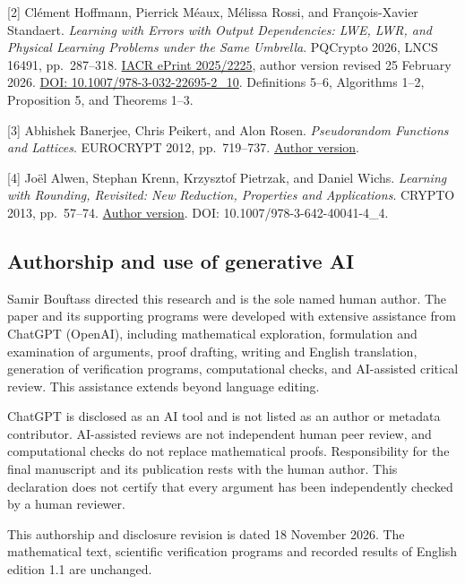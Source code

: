 \documentclass[
]{article}
\begin{document}
{[}2{]} Clément Hoffmann, Pierrick Méaux, Mélissa Rossi, and
François-Xavier Standaert. \emph{Learning with Errors with Output
Dependencies: LWE, LWR, and Physical Learning Problems under the Same
Umbrella}. PQCrypto 2026, LNCS 16491, pp.~287--318.
\href{https://eprint.iacr.org/2025/2225}{IACR ePrint 2025/2225}, author
version revised 25 February 2026.
\href{https://doi.org/10.1007/978-3-032-22695-2_10}{DOI:
10.1007/978-3-032-22695-2\_10}. Definitions 5--6, Algorithms 1--2,
Proposition 5, and Theorems 1--3.

{[}3{]} Abhishek Banerjee, Chris Peikert, and Alon Rosen.
\emph{Pseudorandom Functions and Lattices}. EUROCRYPT 2012,
pp.~719--737.
\href{https://web.eecs.umich.edu/~cpeikert/pubs/prf-lattice.pdf}{Author
version}.

{[}4{]} Joël Alwen, Stephan Krenn, Krzysztof Pietrzak, and Daniel Wichs.
\emph{Learning with Rounding, Revisited: New Reduction, Properties and
Applications}. CRYPTO 2013, pp.~57--74.
\href{https://crypto.ethz.ch/publications/files/AKPW13.pdf}{Author
version}. DOI: 10.1007/978-3-642-40041-4\_4.

\subsection{Authorship and use of generative
AI}\label{authorship-and-use-of-generative-ai}

Samir Bouftass directed this research and is the sole named human
author. The paper and its supporting programs were developed with
extensive assistance from ChatGPT (OpenAI), including mathematical
exploration, formulation and examination of arguments, proof drafting,
writing and English translation, generation of verification programs,
computational checks, and AI-assisted critical review. This assistance
extends beyond language editing.

ChatGPT is disclosed as an AI tool and is not listed as an author or
metadata contributor. AI-assisted reviews are not independent human peer
review, and computational checks do not replace mathematical proofs.
Responsibility for the final manuscript and its publication rests with
the human author. This declaration does not certify that every argument
has been independently checked by a human reviewer.

This authorship and disclosure revision is dated 18 November 2026. The
mathematical text, scientific verification programs and recorded results
of English edition 1.1 are unchanged.
\end{document}
